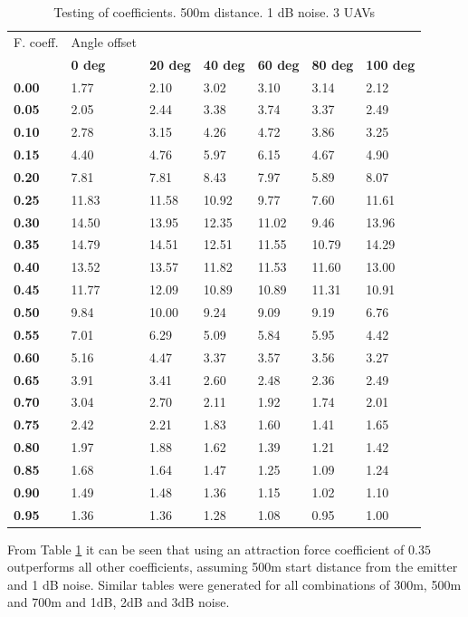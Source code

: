 \documentclass[10pt,a4paper]{book}
\begin{document}
\begin{table}[H]
\centering
\caption{Testing of coefficients. 500m distance. 1 dB noise. 3 \glspl{UAV}}
\small
\begin{tabular}{l l l l l l l}
F. coeff.&Angle offset\\
&\textbf{0 deg}&\textbf{20 deg }&\textbf{40 deg}&\textbf{60 deg}&\textbf{80 deg}&\textbf{100 deg}\\ \hline
\textbf{0.00}&1.77&2.10&3.02&3.10&3.14&2.12\\
\textbf{0.05}&2.05&2.44&3.38&3.74&3.37&2.49\\
\textbf{0.10}&2.78&3.15&4.26&4.72&3.86&3.25\\
\textbf{0.15}&4.40&4.76&5.97&6.15&4.67&4.90\\
\textbf{0.20}&7.81&7.81&8.43&7.97&5.89&8.07\\
\textbf{0.25}&11.83&11.58&10.92&9.77&7.60&11.61\\
\textbf{0.30}&14.50&13.95&12.35&11.02&9.46&13.96\\ \hline
\textbf{0.35}&14.79&14.51&12.51&11.55&10.79&14.29\\\hline
\textbf{0.40}&13.52&13.57&11.82&11.53&11.60&13.00\\
\textbf{0.45}&11.77&12.09&10.89&10.89&11.31&10.91\\
\textbf{0.50}&9.84&10.00&9.24&9.09&9.19&6.76\\
\textbf{0.55}&7.01&6.29&5.09&5.84&5.95&4.42\\
\textbf{0.60}&5.16&4.47&3.37&3.57&3.56&3.27\\
\textbf{0.65}&3.91&3.41&2.60&2.48&2.36&2.49\\
\textbf{0.70}&3.04&2.70&2.11&1.92&1.74&2.01\\
\textbf{0.75}&2.42&2.21&1.83&1.60&1.41&1.65\\
\textbf{0.80}&1.97&1.88&1.62&1.39&1.21&1.42\\
\textbf{0.85}&1.68&1.64&1.47&1.25&1.09&1.24\\
\textbf{0.90}&1.49&1.48&1.36&1.15&1.02&1.10\\
\textbf{0.95}&1.36&1.36&1.28&1.08&0.95&1.00\\

\end{tabular}
\label{TAB_HEUR_OPT_SINGLE}
\end{table}

From Table \ref{TAB_HEUR_OPT_SINGLE} it can be seen that using an attraction force coefficient of $0.35$ outperforms all other coefficients, assuming 500m start distance from the emitter and 1 dB noise. Similar tables were generated for all combinations of 300m, 500m and 700m and 1dB, 2dB and 3dB noise. 
\end{document}
